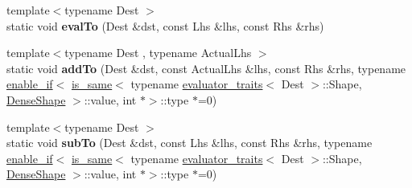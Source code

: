 \begin{DoxyCompactItemize}
\item 
\mbox{\label{struct_eigen_1_1internal_1_1generic__product__impl_3_01_lhs_00_01_rhs_00_01_sparse_shape_00_01_s0f15bf86456099378e4a76f37323e721_ae8120253927b82861baf21a731945ca1}} 
{\footnotesize template$<$typename Dest $>$ }\\static void {\bfseries eval\+To} (Dest \&dst, const Lhs \&lhs, const Rhs \&rhs)
\item 
\mbox{\label{struct_eigen_1_1internal_1_1generic__product__impl_3_01_lhs_00_01_rhs_00_01_sparse_shape_00_01_s0f15bf86456099378e4a76f37323e721_ac72445516fbfd85c9ed223e37852a752}} 
{\footnotesize template$<$typename Dest , typename Actual\+Lhs $>$ }\\static void {\bfseries add\+To} (Dest \&dst, const Actual\+Lhs \&lhs, const Rhs \&rhs, typename \hyperlink{struct_eigen_1_1internal_1_1enable__if}{enable\+\_\+if}$<$ \hyperlink{struct_eigen_1_1internal_1_1is__same}{is\+\_\+same}$<$ typename \hyperlink{struct_eigen_1_1internal_1_1evaluator__traits}{evaluator\+\_\+traits}$<$ Dest $>$\+::Shape, \hyperlink{struct_eigen_1_1_dense_shape}{Dense\+Shape} $>$\+::value, int $\ast$$>$\+::type $\ast$=0)
\item 
\mbox{\label{struct_eigen_1_1internal_1_1generic__product__impl_3_01_lhs_00_01_rhs_00_01_sparse_shape_00_01_s0f15bf86456099378e4a76f37323e721_ac8a761eab9d33aa15edd8663ae68144b}} 
{\footnotesize template$<$typename Dest $>$ }\\static void {\bfseries sub\+To} (Dest \&dst, const Lhs \&lhs, const Rhs \&rhs, typename \hyperlink{struct_eigen_1_1internal_1_1enable__if}{enable\+\_\+if}$<$ \hyperlink{struct_eigen_1_1internal_1_1is__same}{is\+\_\+same}$<$ typename \hyperlink{struct_eigen_1_1internal_1_1evaluator__traits}{evaluator\+\_\+traits}$<$ Dest $>$\+::Shape, \hyperlink{struct_eigen_1_1_dense_shape}{Dense\+Shape} $>$\+::value, int $\ast$$>$\+::type $\ast$=0)
\end{DoxyCompactItemize}
